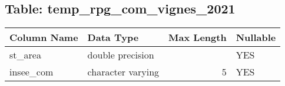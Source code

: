 \subsection*{Table: temp_rpg_com_vignes_2021}
\begin{tabular}{llrl}
\hline
 Column Name   & Data Type         &   Max Length & Nullable   \\
\hline
 st_area       & double precision  &              & YES        \\
 insee_com     & character varying &            5 & YES        \\
\hline
\end{tabular}
